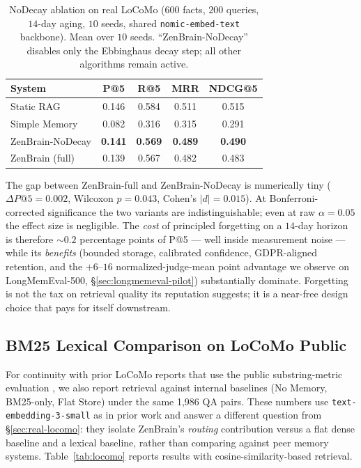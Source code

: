 \documentclass{article}
\begin{document}
\begin{table}[h]
    \caption{NoDecay ablation on real LoCoMo ($600$ facts, $200$ queries,
    $14$-day aging, $10$ seeds, shared \texttt{nomic-embed-text} backbone).
    Mean over $10$ seeds.  ``ZenBrain-NoDecay'' disables only the
    Ebbinghaus decay step; all other algorithms remain active.}
    \label{tab:nodecay}
    \centering
    \begin{tabular}{lcccc}
        \toprule
        System & P@5 & R@5 & MRR & NDCG@5 \\
        \midrule
        Static RAG         & 0.146 & 0.584 & 0.511 & 0.515 \\
        Simple Memory      & 0.082 & 0.316 & 0.315 & 0.291 \\
        ZenBrain-NoDecay   & \textbf{0.141} & \textbf{0.569} & \textbf{0.489} & \textbf{0.490} \\
        ZenBrain (full)    & 0.139 & 0.567 & 0.482 & 0.483 \\
        \bottomrule
    \end{tabular}
\end{table}

The gap between ZenBrain-full and ZenBrain-NoDecay is numerically tiny
($\Delta P@5 = 0.002$, Wilcoxon $p = 0.043$, Cohen's $|d| = 0.015$).
At Bonferroni-corrected significance the two variants are indistinguishable;
even at raw $\alpha = 0.05$ the effect size is negligible.
The \emph{cost} of principled forgetting on a $14$-day horizon is therefore
$\sim$$0.2$ percentage points of P@5 --- well inside measurement noise ---
while its \emph{benefits} (bounded storage, calibrated confidence,
GDPR-aligned retention, and the $+6$--$16$ normalized-judge-mean point
advantage we observe on LongMemEval-500, \S\ref{sec:longmemeval-pilot})
substantially dominate.  Forgetting is not the tax on retrieval quality
its reputation suggests; it is a near-free design choice that pays for
itself downstream.

\subsection{BM25 Lexical Comparison on LoCoMo Public}
\label{app:locomo-bm25}

For continuity with prior LoCoMo reports that use the public
substring-metric evaluation \citep{maharana2024locomo}, we also
report retrieval against internal baselines (No Memory, BM25-only,
Flat Store) under the same 1{,}986 QA pairs. These numbers use
\texttt{text-embedding-3-small} as in prior work and answer a
different question from \S\ref{sec:real-locomo}: they isolate
ZenBrain's \emph{routing} contribution versus a flat dense baseline
and a lexical baseline, rather than comparing against peer memory
systems.
Table~\ref{tab:locomo} reports results with cosine-similarity-based
retrieval.
\end{document}
